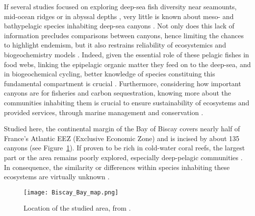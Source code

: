 
If several studies focused on exploring deep-sea fish diversity near seamounts, mid-ocean ridges or in abyssal depths \citep{cook2013,sutton2013}, very little is known about meso- and bathypelagic species inhabiting deep-sea canyons \citep{kenchington2020}. Not only does this lack of information precludes comparisons between canyons, hence limiting the chances to highlight endemism, but it also restrains reliability of ecosystemics and biogeochemistry models \citep{davison2015,kenchington2020}. Indeed, given the essential role of these pelagic fishes in food webs, linking the epipelagic organic matter they feed on to the deep-sea, and in biogeochemical cycling, better knowledge of species constituing this fundamental compartment is crucial \citep{davison2015,gaskett2001}. Furthermore, considering how important canyons are for fisheries and carbon sequestration, knowing more about the communities inhabiting them is crucial to ensure sustainability of ecosystems and provided services, through marine management and conservation \citep{fernandez-arcaya2017,vandenbeld2017a}.

Studied here, the continental margin of the Bay of Biscay covers nearly half of France's Atlantic EEZ (Exclusive Economic Zone) and is incised by about 135 canyons \citep{bourillet2006,spitz2019,vandenbeld2017} (see Figure~\ref{fig:bbm}). If proven to be rich in cold-water coral reefs, the largest part or the area remains poorly explored, especially deep-pelagic communities \citep{garcia2021,vandenbeld2017a,webb2010}. In consequence, the similarity or differences within species inhabiting these ecosystems are virtually unknown \citep{kenchington2020}. 

\begin{figure} [!htbp]
	\begin{center}
		\texttt{[image: Biscay\_Bay\_map.png]}
	\end{center}
	\caption[Map of the studied area]{Location of the studied area, from \citep{bearez2017}.}
	\label{fig:bbm}
\end{figure}

